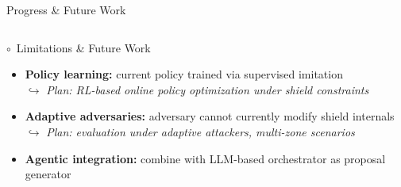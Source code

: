 \documentclass[aspectratio=169,10pt]{beamer}
\newcommand{\pmark}{\textcolor{alertorange}{$\circ$}}
\begin{document}
\begin{frame}[t,shrink=35]{Progress \& Future Work}{}
\begin{columns}[t]
\begin{alertblock}{\pmark\ Limitations \& Future Work}
\begin{itemize}
        \item \textbf{Policy learning:} current policy trained via supervised imitation\\
              $\hookrightarrow$ \textit{Plan: RL-based online policy optimization under shield constraints}
        \item \textbf{Adaptive adversaries:} adversary cannot currently modify shield internals\\
              $\hookrightarrow$ \textit{Plan: evaluation under adaptive attackers, multi-zone scenarios}
        \item \textbf{Agentic integration:} combine with LLM-based orchestrator as proposal generator \cite{toward_autonomous_oran_2026,lee2024llmran}
      \end{itemize}
    \end{alertblock}
  \end{columns}
\end{frame}
\end{document}
